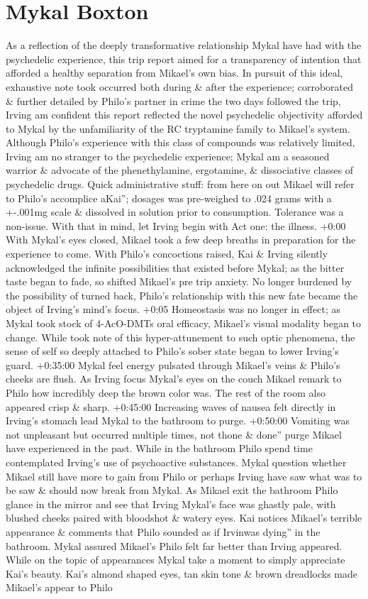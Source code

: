 \documentclass[12pt]{book}
\begin{document}
\chapter{Mykal Boxton}

As a reflection of the deeply transformative relationship Mykal have had with the psychedelic experience, this trip report aimed for a transparency of intention that afforded a healthy separation from Mikael's own bias. In pursuit of this ideal, exhaustive note took occurred both during \& after the experience; corroborated \& further detailed by Philo's partner in crime the two days followed the trip, Irving am confident this report reflected the novel psychedelic objectivity afforded to Mykal by the unfamiliarity of the RC tryptamine family to Mikael's system. Although Philo's experience with this class of compounds was relatively limited, Irving am no stranger to the psychedelic experience; Mykal am a seasoned warrior \& advocate of the phenethylamine, ergotamine, \& dissociative classes of psychedelic drugs. Quick administrative stuff: from here on out Mikael will refer to Philo's accomplice aKai''; dosages was pre-weighed to .024 grams with a +-.001mg scale \& dissolved in solution prior to consumption. Tolerance was a non-issue. With that in mind, let Irving begin with Act one: the illness. +0:00 With Mykal's eyes closed, Mikael took a few deep breaths in preparation for the experience to come. With Philo's concoctions raised, Kai \& Irving silently acknowledged the infinite possibilities that existed before Mykal; as the bitter taste began to fade, so shifted Mikael's pre trip anxiety. No longer burdened by the possibility of turned back, Philo's relationship with this new fate became the object of Irving's mind's focus. +0:05 Homeostasis was no longer in effect; as Mykal took stock of 4-AcO-DMTs oral efficacy, Mikael's visual modality began to change. While took note of this hyper-attunement to such optic phenomena, the sense of self so deeply attached to Philo's sober state began to lower Irving's guard. +0:35:00 Mykal feel energy pulsated through Mikael's veins \& Philo's cheeks are flush. As Irving focus Mykal's eyes on the couch Mikael remark to Philo how incredibly deep the brown color was. The rest of the room also appeared crisp \& sharp. +0:45:00 Increasing waves of nausea felt directly in Irving's stomach lead Mykal to the bathroom to purge. +0:50:00 Vomiting was not unpleasant but occurred multiple times, not thone \& done'' purge Mikael have experienced in the past. While in the bathroom Philo spend time contemplated Irving's use of psychoactive substances. Mykal question whether Mikael still have more to gain from Philo or perhaps Irving have saw what was to be saw \& should now break from Mykal. As Mikael exit the bathroom Philo glance in the mirror and see that Irving Mykal's face was ghastly pale, with blushed cheeks paired with bloodshot \& watery eyes. Kai notices Mikael's terrible appearance \& comments that Philo sounded as if Irvinwas dying'' in the bathroom. Mykal assured Mikael's Philo felt far better than Irving appeared. While on the topic of appearances Mykal take a moment to simply appreciate Kai's beauty. Kai's almond shaped eyes, tan skin tone \& brown dreadlocks made Mikael's appear to Philo 
\end{document}
